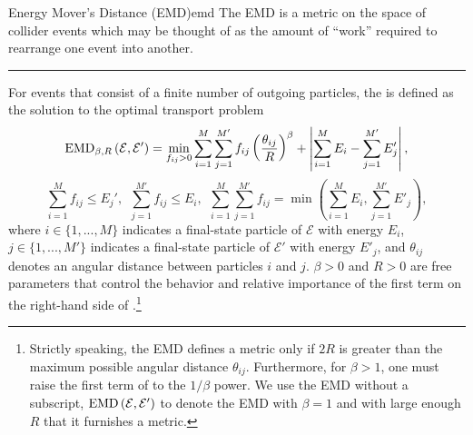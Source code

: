 \begin{definitionbox}{Energy Mover's Distance (EMD)}{emd}
    The EMD is a metric on the space of collider events which may be thought of as the amount of ``work'' required to rearrange one event into another.

    \vspace{7pt}
    \hrule
    \vspace{7pt}

    For events that consist of a finite number of outgoing particles, the  is defined as the solution to the optimal transport problem
    \begin{equation}
        \label{eq:EMD_def_1}
        {\rm EMD}_{\beta, R}\left(\mathcal{E}, \mathcal{E}'\right)
        =
        \min_{f_{ij} > 0} \sum_{i = 1}^M \sum_{j = 1}^{M'} f_{ij} \left(\frac{\theta_{ij}}{R}\right)^\beta
        +
        \left| \sum_{i = 1}^M E_i -  \sum_{j = 1}^{M'} E'_j\right|,
    \end{equation}
    \begin{equation}
        \sum_{i = 1}^M f_{ij} \leq E_j',
        ~~
        \sum_{j = 1}^{M'} f_{ij} \leq E_i,
        ~~
        \sum_{i = 1}^M \sum_{j = 1}^{M'} f_{ij}
        = \min\left(\sum_{i = 1}^M E_i, \sum_{j = 1}^{M'} E'_j\right)
        \label{eq:EMD_def_2}
        ,
    \end{equation}
    where \(i \in \{1, ..., M\}\) indicates a final-state particle of \(\mathcal{E}\) with energy \(E_i\), \(j \in \{1, ..., M'\}\) indicates a final-state particle of \(\mathcal{E}'\) with energy \(E'_j\), and \(\theta_{ij}\) denotes an angular distance between particles \(i\) and \(j\).
    \(\beta > 0\) and \(R > 0\) are free parameters that control the behavior and relative importance of the first term on the right-hand side of .\footnote{
    Strictly speaking, the EMD defines a metric only if \(2 R\) is greater than the maximum possible angular distance \(\theta_{ij}\).
    Furthermore, for \(\beta > 1\), one must raise the first term of  to the \(1/\beta\) power.
    We use the EMD without a subscript, \(
    {\rm EMD}\left(\mathcal{E}, \mathcal{E}'\right)
    \) to denote the EMD with \(\beta = 1\) and with large enough \(R\) that it furnishes a metric.
    }
\end{definitionbox}


